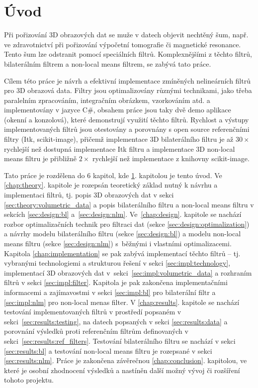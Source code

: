 
\chapter{Úvod}
\label{chap:introduction}

Při pořizování 3D obrazových dat se muže v datech objevit nechtěný šum, např.  ve zdravotnictví při pořizování výpočetní tomografie či magnetické resonance. Tento šum lze odstranit pomocí speciálních filtrů. Komplexnějšími z těchto filtrů, bilaterálním filtrem a non-local means filtrem, se zabývá tato práce. 

Cílem této práce je návrh a efektivní implementace zmíněných nelineárních filtrů pro 3D obrazová data. Filtry jsou optimalizovány různými technikami, jako třeba paralelním zpracováním, integračním obrázkem, vzorkováním atd. a implementovány v jazyce C\#, obsahem práce jsou taky dvě demo aplikace (okenní a konzolová), které demonstrují využití těchto filtrů. Rychlost a výstupy implementovaných filtrů jsou otestovány a porovnány s open source referenčními filtry (Itk, scikit-image), přičemž implementace 3D bilaterálního filtru je až $30\times$ rychlejší než dostupná implementace Itk filtru a implementace 3D non-local means filtru je přibližně $2\times$ rychlejší než implementace z knihovny scikit-image.

Tato práce je rozdělena do 6 kapitol, kde \ref{chap:introduction}. kapitolou je tento úvod. Ve \ref{chap:theory}. kapitole je rozepsán teoretický základ nutný k návrhu a implementaci filtrů, tj. popis 3D obrazových dat v sekci \ref{sec:theory:volumetric_data} a popis bilaterálního filtru a non-local means filtru v sekcích \ref{sec:design:bl} a~\ref{sec:design:nlm}. Ve~\ref{chap:design}. kapitole se nachází rozbor optimalizačních technik pro filtraci dat (sekce \ref{sec:design:optimalization}) a návrhy modelu bilaterálního filtru (sekce \ref{sec:design:bl}) a modelu non-local means filtru (sekce \ref{sec:design:nlm}) s~běžnými i vlastními optimalizacemi. 
Kapitola \ref{chap:implementation} se pak zabývá implementací těchto filtrů -- tj. vybranými technologiemi a strukturou řešení v sekci \ref{sec:impl:technology}, implementací 3D obrazových dat v~sekci~\ref{sec:impl:volumetric_data} a rozhraním filtrů v sekci \ref{sec:impl:filter}. Kapitola je pak zakončena implementačními informacemi a zajímavostmi v sekci \ref{sec:impl:bl} pro bilaterální filtr a \ref{sec:impl:nlm} pro non-local menas filter. V \ref{chap:results}. kapitole se nachází testování implementovaných filtrů v prostředí popsaném v sekci~\ref{sec:results:testing}, na datech popsaných v sekci \ref{sec:results:data} a porovnání výsledků proti referenčním filtrům definovaných v sekci~\ref{sec:results:ref_filters}. Testování bilaterálního filtru se nachází v  sekci \ref{sec:results:bl} a testování non-local means filtru je rozepsané v sekci \ref{sec:results:nlm}. Práce je zakončena závěrečnou \ref{chap:conclusion}. kapitolou, ve které je osobní zhodnocení výsledků a nastíněn další možný vývoj či rozšíření tohoto projektu.

